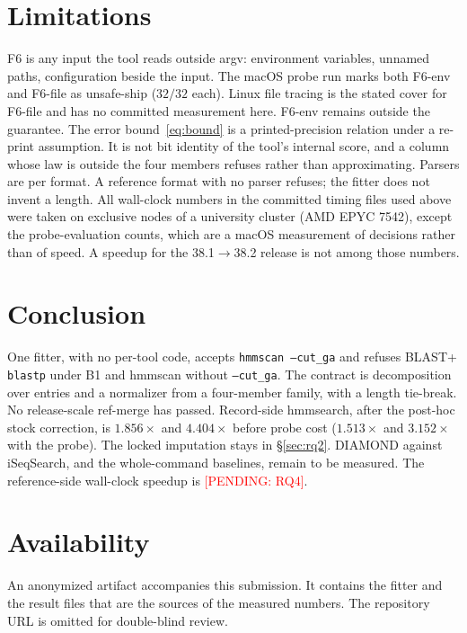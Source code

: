 \documentclass[letterpaper,twocolumn,10pt]{article}
\newcommand{\pending}[1]{\textcolor{red}{[PENDING: #1]}}
\begin{document}
\section{Limitations}
\label{sec:limits}

F6 is any input the tool reads outside argv: environment variables, unnamed paths, configuration beside the input.
The macOS probe run marks both F6-env and F6-file as unsafe-ship
($32/32$ each).
Linux file tracing is the stated cover for F6-file and has no committed measurement here.
F6-env remains outside the guarantee.
The error bound~\eqref{eq:bound} is a printed-precision relation under a re-print assumption.
It is not bit identity of the tool's internal score, and a column whose law is outside the four members refuses rather than approximating.
Parsers are per format.
A reference format with no parser refuses; the fitter does not invent a length.
All wall-clock numbers in the committed timing files used above were taken on exclusive nodes of a university cluster (AMD EPYC 7542), except the probe-evaluation counts, which are a macOS measurement of decisions rather than of speed.
A speedup for the 38.1$\to$38.2 release is not among those numbers.

\section{Conclusion}

One fitter, with no per-tool code, accepts \texttt{hmmscan --cut\_ga} and refuses BLAST+ \texttt{blastp} under B1 and hmmscan without \texttt{--cut\_ga}.
The contract is decomposition over entries and a normalizer from a four-member family, with a length tie-break.
No release-scale ref-merge has passed.
Record-side hmmsearch, after the post-hoc stock correction, is
$1.856\times$ and $4.404\times$
before probe cost
($1.513\times$ and $3.152\times$ with the probe).
The locked imputation stays in \S\ref{sec:rq2}.
DIAMOND against iSeqSearch, and the whole-command baselines, remain to be measured.
The reference-side wall-clock speedup is
\pending{RQ4}.

\section*{Availability}

An anonymized artifact accompanies this submission.
It contains the fitter and the result files that are the sources of the measured numbers.
The repository URL is omitted for double-blind review.



\end{document}
